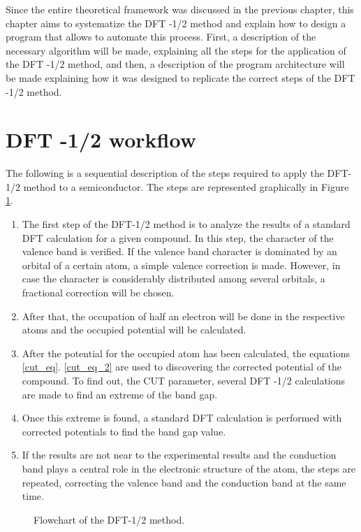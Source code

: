 Since the entire theoretical framework was discussed in the previous chapter, this chapter aims to systematize the DFT -1/2 method and explain how to design a program that allows to automate this process. First, a description of the necessary algorithm will be made, explaining all the steps for the application of the DFT -1/2 method, and then, a description of the program architecture will be made explaining how it was designed to replicate the correct steps of the DFT -1/2 method.
\section{DFT -1/2 workflow}
The following is a sequential description of the steps required to apply the DFT-1/2 method to a semiconductor. The steps are represented graphically in Figure \ref{dfthalf-flow}.
\begin{enumerate}
    \item The first step of the DFT-1/2 method is to analyze the results of a standard DFT calculation for a given compound. In this step, the character of the valence band is verified. If the valence band character is dominated by an orbital of a certain atom, a simple valence correction is made. However, in case the character is considerably distributed among several orbitals, a fractional correction will be chosen.
    \item After that, the occupation of half an electron will be done in the respective atoms and the occupied potential will be calculated.
    \item After the potential for the occupied atom has been calculated, the equations \ref{cut_eq}. \ref{cut_eq_2} are used to discovering the corrected potential of the compound. To find out, the CUT parameter, several DFT -1/2 calculations are made to find an extreme of the band gap.
    \item Once this extreme is found, a standard DFT calculation is performed with corrected potentials to find the band gap value.
    \item If the results are not near to the experimental results and the conduction band plays a central role in the electronic structure of the atom, the steps are repeated, correcting the valence band and the conduction band at the same time.
\end{enumerate}
\begin{figure}[!ht]
        \centering
        
        \caption{Flowchart of the DFT-1/2 method.}
        \label{dfthalf-flow}
\end{figure}

